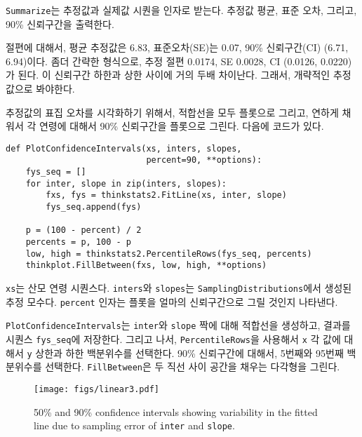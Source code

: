{\tt Summarize}는 추정값과 실제값 시퀀을 인자로 받는다. 추정값 평균, 표준 오차, 그리고, 90\% 신뢰구간을 출력한다.

절편에 대해서, 평균 추정값은 6.83, 표준오차(SE)는 0.07, 90\% 신뢰구간(CI) (6.71, 6.94)이다. 좀더 간략한 형식으로, 추정 절편 0.0174, SE 0.0028, CI (0.0126, 0.0220)가 된다. 이 신뢰구간 하한과 상한 사이에 거의 두배 차이난다. 그래서, 개략적인 추정값으로 봐야한다.


추정값의 표집 오차를 시각화하기 위해서, 적합선을 모두 플롯으로 그리고, 연하게 채워서 각 연령에 대해서 90\% 신뢰구간을 플롯으로 그린다. 다음에 코드가 있다.

\begin{verbatim}
def PlotConfidenceIntervals(xs, inters, slopes,
                            percent=90, **options):
    fys_seq = []
    for inter, slope in zip(inters, slopes):
        fxs, fys = thinkstats2.FitLine(xs, inter, slope)
        fys_seq.append(fys)

    p = (100 - percent) / 2
    percents = p, 100 - p
    low, high = thinkstats2.PercentileRows(fys_seq, percents)
    thinkplot.FillBetween(fxs, low, high, **options)
\end{verbatim}

{\tt xs}는 산모 연령 시퀀스다. {\tt inters}와 {\tt slopes}는 {\tt SamplingDistributions}에서 생성된 추정 모수다. {\tt percent} 인자는 플롯을 얼마의 신뢰구간으로 그릴 것인지 나타낸다.

{\tt PlotConfidenceIntervals}는 {\tt inter}와 {\tt slope} 짝에 대해 적합선을 생성하고, 결과를 시퀀스 \verb"fys_seq"에 저장한다.
그리고 나서, {\tt PercentileRows}을 사용해서 {\tt x} 각 값에 대해서 {\tt y} 상한과 하한 백분위수를 선택한다. 
90\% 신뢰구간에 대해서, 5번째와 95번째 백분위수를 선택한다. 
{\tt FillBetween}은 두 직선 사이 공간을 채우는 다각형을 그린다.

\begin{figure}
\centerline{\texttt{[image: figs/linear3.pdf]}}
\caption{50\% and 90\% confidence intervals showing variability in the
  fitted line due to sampling error of {\tt inter} and {\tt slope}.}
\label{linear3}
\end{figure}

